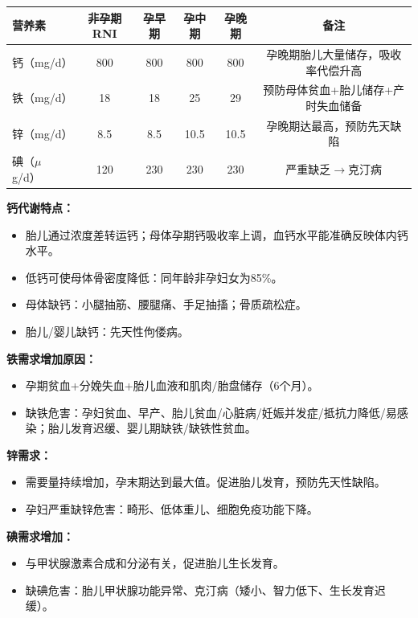 \begin{keybox}
\begin{center}
\begin{tabular}{lccccc}
\hline
\textbf{营养素} & \textbf{非孕期RNI} & \textbf{孕早期} & \textbf{孕中期} & \textbf{孕晚期} & \textbf{备注} \\
\hline
钙（mg/d） & 800 & 800 & 800 & 800 & 孕晚期胎儿大量储存，吸收率代偿升高 \\
铁（mg/d） & 18 & 18 & 25 & 29 & 预防母体贫血+胎儿储存+产时失血储备 \\
锌（mg/d） & 8.5 & 8.5 & 10.5 & 10.5 & 孕晚期达最高，预防先天缺陷 \\
碘（$\mu$g/d） & 120 & 230 & 230 & 230 & 严重缺乏$\rightarrow$克汀病 \\
\hline
\end{tabular}
\end{center}

\textbf{钙代谢特点：}
\begin{itemize}[leftmargin=*]
    \item 胎儿通过浓度差转运钙；母体孕期钙吸收率上调，血钙水平能准确反映体内钙水平。
    \item 低钙可使母体骨密度降低：同年龄非孕妇女为85\%。
    \item 母体缺钙：小腿抽筋、腰腿痛、手足抽搐；骨质疏松症。
    \item 胎儿/婴儿缺钙：先天性佝偻病。
\end{itemize}

\textbf{铁需求增加原因：}
\begin{itemize}[leftmargin=*]
    \item 孕期贫血+分娩失血+胎儿血液和肌肉/胎盘储存（6个月）。
    \item 缺铁危害：孕妇贫血、早产、胎儿贫血/心脏病/妊娠并发症/抵抗力降低/易感染；胎儿发育迟缓、婴儿期缺铁/缺铁性贫血。
\end{itemize}

\textbf{锌需求：}
\begin{itemize}[leftmargin=*]
    \item 需要量持续增加，孕末期达到最大值。促进胎儿发育，预防先天性缺陷。
    \item 孕妇严重缺锌危害：畸形、低体重儿、细胞免疫功能下降。
\end{itemize}

\textbf{碘需求增加：}
\begin{itemize}[leftmargin=*]
    \item 与甲状腺激素合成和分泌有关，促进胎儿生长发育。
    \item 缺碘危害：胎儿甲状腺功能异常、克汀病（矮小、智力低下、生长发育迟缓）。
\end{itemize}


\end{keybox}
